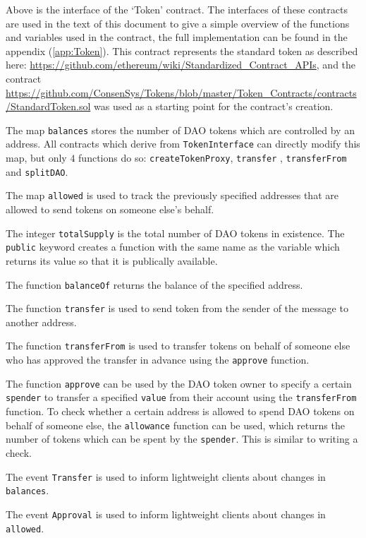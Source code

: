 \documentclass[9pt,oneside]{amsart}
\begin{document}
\begin{multicols}{2}

Above is the interface of the ‘Token’ contract. The interfaces of these contracts are used in the text of this document to give a simple overview of the functions and variables used in the contract, the full implementation can be found in the appendix (\ref{app:Token}). This contract represents the standard token as described here:
\url{https://github.com/ethereum/wiki/Standardized_Contract_APIs}, and the contract \url{https://github.com/ConsenSys/Tokens/blob/master/Token_Contracts/contracts/StandardToken.sol} was used as a starting point for the contract’s creation.

The map \verb|balances| stores the number of DAO tokens which are controlled by an address. All contracts which derive from \verb|TokenInterface| can directly modify this map, but only $4$ functions do so: \verb|createTokenProxy|, \verb|transfer| , \verb|transferFrom| and \verb|splitDAO|.

The map \verb|allowed| is used to track the previously specified addresses that are allowed to send tokens on someone else's behalf.

The integer \verb|totalSupply| is the total number of DAO tokens in existence. The \verb|public| keyword creates a function with the same name as the variable which returns its value so that it is publically available.

The function \verb|balanceOf| returns the balance of the specified address. 

The function \verb|transfer| is used to send token from the sender of the message to another address.

The function \verb|transferFrom| is used to transfer tokens on behalf of someone else who has approved the transfer in advance using the \verb|approve| function.

The function \verb|approve| can be used by the DAO token owner to specify a certain \verb|spender| to transfer a specified \verb|value| from their account using the \verb|transferFrom| function. To check whether a certain address is allowed to spend DAO tokens on behalf of someone else, the \verb|allowance| function can be used, which returns the number of tokens which can be spent by the \verb|spender|. This is similar to writing a check.

The event \verb|Transfer| is used to inform lightweight clients about changes in \verb|balances|.

The event \verb|Approval| is used to inform lightweight clients about changes in \verb|allowed|.
\end{multicols}
\end{document}
